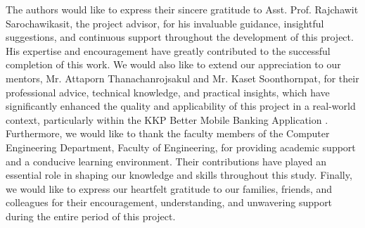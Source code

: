 \documentclass[12pt,oneside,openright,a4paper]{cpe-english-project}
\begin{document}
\preface
The authors would like to express their sincere gratitude to Asst. Prof. Rajchawit Sarochawikasit, the project advisor, for his invaluable guidance, insightful suggestions, and continuous support throughout the development of this project. His expertise and encouragement have greatly contributed to the successful completion of this work.
We would also like to extend our appreciation to our mentors, Mr. Attaporn Thanachanrojsakul and Mr. Kaset Soonthornpat, for their professional advice, technical knowledge, and practical insights, which have significantly enhanced the quality and applicability of this project in a real-world context, particularly within the KKP Better Mobile Banking Application .
Furthermore, we would like to thank the faculty members of the Computer Engineering Department, Faculty of Engineering, for providing academic support and a conducive learning environment. Their contributions have played an essential role in shaping our knowledge and skills throughout this study.
Finally, we would like to express our heartfelt gratitude to our families, friends, and colleagues for their encouragement, understanding, and unwavering support during the entire period of this project.

\tableofcontents                    
\listoffigures                      
\end{document}
